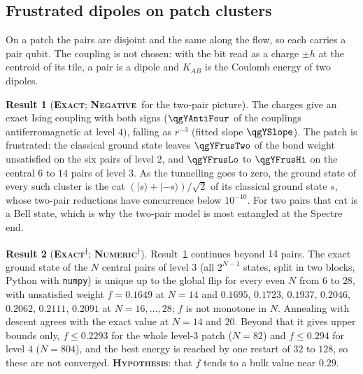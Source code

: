\documentclass[11pt]{article}
\newcommand{\exact}{\textbf{\textsc{Exact}}}
\newcommand{\numeric}{\textbf{\textsc{Numeric}}}
\newcommand{\hypo}{\textbf{\textsc{Hypothesis}}}
\newcommand{\negres}{\textbf{\textsc{Negative}}}
\newcommand{\snap}{\textsuperscript{$\dagger$}}      %
\theoremstyle{definition}
\newtheorem{result}{Result}
\begin{document}
\subsection{Frustrated dipoles on patch clusters}\label{sec:ham-patch}
On a patch the pairs are disjoint and the same along the flow, so each carries a pair qubit. The coupling is not chosen: with the bit read as a charge $\pm h$ at the centroid of its tile, a pair is a dipole and $K_{AB}$ is the Coulomb energy of two dipoles.
\begin{result}[\exact; \negres\ for the two-pair picture]\label{res:ham-patch}
The charges give an exact Ising coupling with both signs ($\qgYAntiFour$ of the couplings antiferromagnetic at level $4$), falling as $r^{-3}$ (fitted slope $\qgYSlope$). The patch is frustrated: the classical ground state leaves $\qgYFrusTwo$ of the bond weight unsatisfied on the six pairs of level $2$, and $\qgYFrusLo$ to $\qgYFrusHi$ on the central $6$ to $14$ pairs of level $3$. As the tunnelling goes to zero, the ground state of every such cluster is the cat $(|s\rangle+|{-s}\rangle)/\sqrt2$ of its classical ground state $s$, whose two-pair reductions have concurrence below $10^{-10}$. For two pairs that cat is a Bell state, which is why the two-pair model is most entangled at the Spectre end.
\end{result}
\begin{result}[\exact\snap; \numeric\snap]\label{res:ham-dipole-large}
Result~\ref{res:ham-patch} continues beyond $14$ pairs. The exact ground state of the $N$ central pairs of level $3$ (all $2^{N-1}$ states, split in two blocks, Python with \texttt{numpy}) is unique up to the global flip for every even $N$ from $6$ to $28$, with unsatisfied weight $f=0.1649$ at $N=14$ and $0.1695$, $0.1723$, $0.1937$, $0.2046$, $0.2062$, $0.2111$, $0.2091$ at $N=16,\dots,28$; $f$ is not monotone in $N$. Annealing with descent agrees with the exact value at $N=14$ and $20$. Beyond that it gives upper bounds only, $f\le0.2293$ for the whole level-$3$ patch ($N=82$) and $f\le0.294$ for level $4$ ($N=804$), and the best energy is reached by one restart of $32$ to $128$, so these are not converged. \hypo: that $f$ tends to a bulk value near $0.29$.
\end{result}
\end{document}

